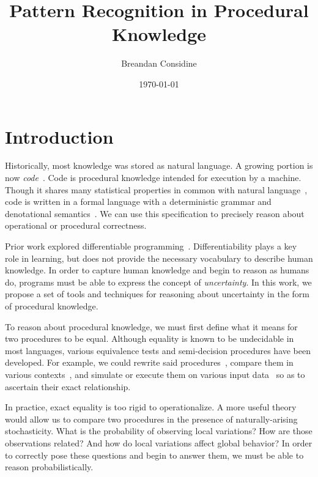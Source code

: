 \documentclass[11pt]{article}
\title{Pattern Recognition in Procedural Knowledge}
\author{Breandan Considine}
\date{\today}
\begin{document}
    \maketitle

    \tableofcontents
    \pagebreak


    \section{Introduction}

    Historically, most knowledge was stored as natural language. A growing portion is now \textit{code}~\citep{allamanis2018survey}. Code is procedural knowledge intended for execution by a machine. Though it shares many statistical properties in common with natural language~\citep{hindle2012naturalness}, code is written in a formal language with a deterministic grammar and denotational semantics~\citep{pierce2010software}. We can use this specification to precisely reason about operational or procedural correctness.

    Prior work explored differentiable programming~\citep{considine2019programming}. Differentiability plays a key role in learning, but does not provide the necessary vocabulary to describe human knowledge. In order to capture human knowledge and begin to reason as humans do, programs must be able to express the concept of \textit{uncertainty}. In this work, we propose a set of tools and techniques for reasoning about uncertainty in the form of procedural knowledge.

    To reason about procedural knowledge, we must first define what it means for two procedures to be equal. Although equality is known to be undecidable in most languages, various equivalence tests and semi-decision procedures have been developed. For example, we could rewrite said procedures~\citep{baader1999term}, compare them in various contexts~\citep{felleisen1990expressive}, and simulate or execute them on various input data~\citep{chen2020metamorphic} so as to ascertain their exact relationship.

    In practice, exact equality is too rigid to operationalize. A more useful theory would allow us to compare two procedures in the presence of naturally-arising stochasticity. What is the probability of observing local variations? How are those observations related? And how do local variations affect global behavior? In order to correctly pose these questions and begin to answer them, we must be able to reason probabilistically.
\end{document}
